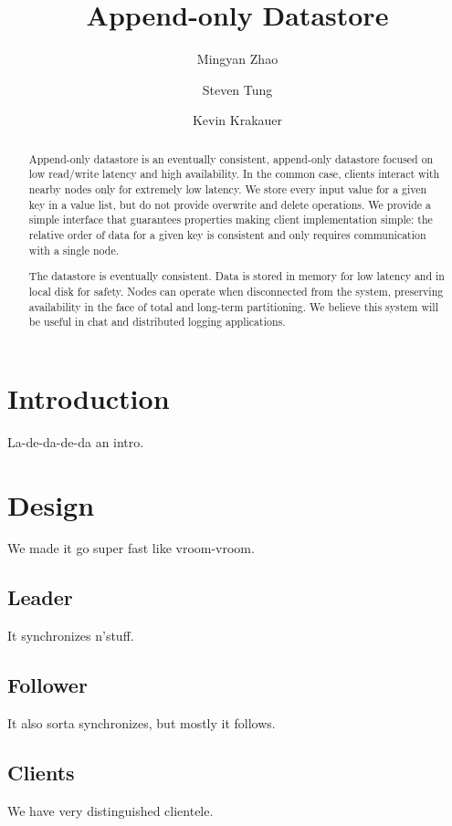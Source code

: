 \documentclass[11pt,english,twocolumn]{article}
\title{Append-only Datastore}
\author{
	Mingyan Zhao
	\and
	Steven Tung
	\and
	Kevin Krakauer
}
\date{}
\begin{document}
\maketitle


\begin{abstract}
Append-only datastore is an eventually consistent, append-only datastore focused
on low read/write latency and high availability. In the common case, clients
interact with nearby nodes only for extremely low latency. We store every input
value for a given key in a value list, but do not provide overwrite and delete
operations. We provide a simple interface that guarantees properties making
client implementation simple: the relative order of data for a given key is
consistent and only requires communication with a single node.

The datastore is eventually consistent. Data is stored in memory for low latency
and in local disk for safety. Nodes can operate when disconnected from the
system, preserving availability in the face of total and long-term partitioning.
We believe this system will be useful in chat and distributed logging
applications.
\end{abstract}

\section{Introduction}
La-de-da-de-da an intro.

\section{Design}
We made it go super fast like vroom-vroom.

\subsection{Leader}
It synchronizes n'stuff.

\subsection{Follower}
It also sorta synchronizes, but mostly it follows.

\subsection{Clients}
We have very distinguished clientele.
\end{document}
